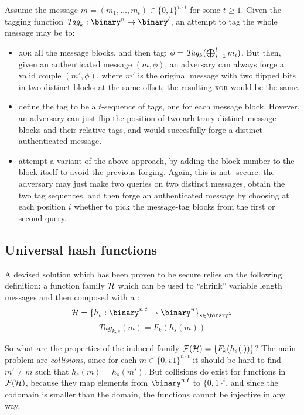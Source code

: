 Assume the message $m = (m_1, \dots, m_t) \in \{0,1\}^{n\cdot t}$ for some $t \geq 1$. Given the tagging function $\textit{Tag}_{k} : \binary^n \to \binary^l$, an attempt to tag the whole message may be to:

\begin{itemize}    
    \item \textsc{xor} all the message blocks, and then tag: $\phi = \textit{Tag}_k(\bigoplus_{i=1}^{t} m_i)$. But then, given an authenticated message $(m, \phi)$, an adversary can always forge a valid couple $(m', \phi)$, where $m'$ is the original message with two flipped bits in two distinct blocks at the same offset; the resulting \textsc{xor} would be the same.

    \item define the tag to be a $t$-sequence of tags, one for each message block. Hovever, an adversary can just flip the position of two arbitrary distinct message blocks and their relative tags, and would succesfully forge a distinct authenticated message.

    \item attempt a variant of the above approach, by adding the block number to the block itself to avoid the previous forging. Again, this is not \ufcma-secure: the adversary may just make two queries on two distinct messages, obtain the two tag sequences, and then forge an authenticated message by choosing at each position $i$ whether to pick the message-tag blocks from the first or second query.

\end{itemize}

\subsection{Universal hash functions}

A devised solution which has been proven to be secure relies on the following definition: a function family $\mathcal{H}$ which can be used to ``shrink'' variable length messages and then composed with a \prf{}:
\[
   \H = \{h_s : \binary^{n\cdot t} \to \binary^n \}_{s \in \binary^\lambda}
\]
\[
   \textit{Tag}_{k, s}(m) = F_k(h_s(m))
\]

So what are the properties of the induced family $\mathcal{F}(\mathcal{H}) = \{F_{k}(h_{s}(.))\}$? The main problem are \emph{collisions}, since for each $m \in \{0,v1\}^{n\cdot t}$ it should be hard to find $m' \neq m$ such that $h_s(m) = h_s(m')$. But collisions do exist for functions in $\mathcal{F}(\mathcal{H})$, because they map elements from $\binary^{n\cdot t} $ to $\{0,1\}^t$, and since the codomain is smaller than the domain, the functions cannot be injective in any way.


